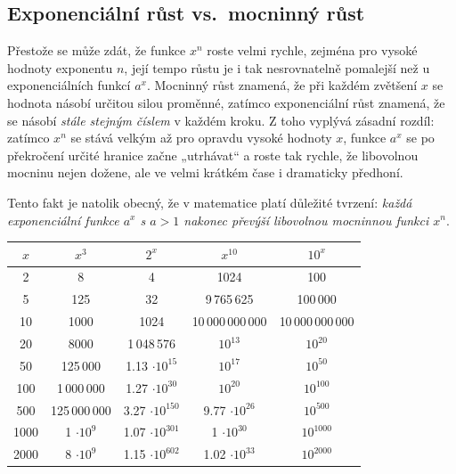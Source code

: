 \documentclass[12pt,a4paper]{article}
\begin{document}
\subsection*{Exponenciální růst vs.\ mocninný růst}

Přestože se může zdát, že funkce $x^{n}$ roste velmi rychle, zejména pro vysoké hodnoty exponentu $n$,
její tempo růstu je i tak nesrovnatelně pomalejší než u exponenciálních funkcí $a^{x}$.
Mocninný růst znamená, že při každém zvětšení $x$ se hodnota násobí určitou
silou proměnné, zatímco exponenciální růst znamená, že se násobí \emph{stále stejným číslem}
v každém kroku. Z toho vyplývá zásadní rozdíl: zatímco $x^{n}$ se stává velkým až pro opravdu
vysoké hodnoty $x$, funkce $a^{x}$ se po překročení určité hranice začne „utrhávat“
a roste tak rychle, že libovolnou mocninu nejen dožene, ale ve velmi krátkém čase i dramaticky předhoní.

Tento fakt je natolik obecný, že v matematice platí důležité tvrzení:
\emph{každá exponenciální funkce $a^{x}$ s $a>1$ nakonec převýší libovolnou mocninnou funkci $x^{n}$}.

\bigskip
\begin{center}
    \begin{tabular}{c|c|c|c|c}
    $x$ & $x^{3}$ & $2^{x}$ & $x^{10}$ & $10^{x}$ \\
    \hline
    2           & 8                     & 4                         & 1024                      & 100 \\
    5           & 125                   & 32                        & 9\,765\,625               & 100\,000 \\
    10          & 1000                  & 1024                      & 10\,000\,000\,000         & 10\,000\,000\,000 \\
    20          & 8000                  & 1\,048\,576               & $10^{13}$                 & $10^{20}$ \\
    50          & 125\,000              & 1.13 $\cdot 10^{15}$      & $10^{17}$                 & $10^{50}$ \\
    100         & 1\,000\,000           & 1.27 $\cdot 10^{30}$      & $10^{20}$                 & $10^{100}$ \\
    500         & 125\,000\,000         & 3.27 $\cdot 10^{150}$     & 9.77 $\cdot 10^{26}$      & $10^{500}$ \\
    1000        & 1 $\cdot 10^{9}$      & 1.07 $\cdot 10^{301}$     & 1 $\cdot 10^{30}$         & $10^{1000}$ \\
    2000        & 8 $\cdot 10^{9}$      & 1.15 $\cdot 10^{602}$     & 1.02 $\cdot 10^{33} $     & $10^{2000}$ \\
    \end{tabular}
\end{center}
\end{document}

